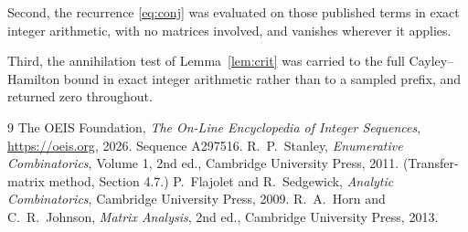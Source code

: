 \documentclass[11pt,a4paper]{article}
\theoremstyle{plain}
\theoremstyle{definition}
\begin{document}
Second, the recurrence \eqref{eq:conj} was evaluated on those published terms in exact
integer arithmetic, with no matrices involved, and vanishes wherever it applies.

Third, the annihilation test of Lemma~\ref{lem:crit} was carried to the full
Cayley--Hamilton bound in exact integer arithmetic rather than to a sampled prefix, and
returned zero throughout.

\begin{thebibliography}{9}
 The OEIS Foundation, \emph{The On-Line Encyclopedia of Integer
Sequences}, \url{https://oeis.org}, 2026. Sequence A297516.
 R.~P.~Stanley, \emph{Enumerative Combinatorics}, Volume 1, 2nd ed.,
Cambridge University Press, 2011. (Transfer-matrix method, Section 4.7.)
 P.~Flajolet and R.~Sedgewick, \emph{Analytic Combinatorics}, Cambridge
University Press, 2009.
 R.~A.~Horn and C.~R.~Johnson, \emph{Matrix Analysis}, 2nd ed., Cambridge
University Press, 2013.
\end{thebibliography}
\end{document}
